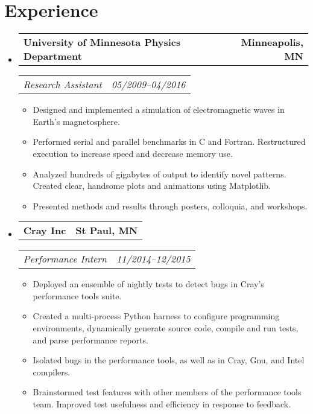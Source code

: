 \documentclass[11pt,letterpaper]{article}
\makeatletter
\newcommand{\headerrow}[2]{
  \begin{tabular*}{\linewidth}{l@{ \extracolsep{\fill} }r} #1 & #2 
  \end{tabular*}}
\newcommand{\YearRange}[2]{#1--#2}
\newcommand{\ResumeSection}[1]{
  \section*{ {\color{MidnightBlue}#1 \sout{\hfill} } } }
\newcommand{\CPP}{
  C\nolinebreak[4]\hspace{-.05em}\raisebox{.22ex}{\footnotesize\bf ++}\xspace}
\makeatother
\begin{document}

\ResumeSection{Experience}

\begin{itemize}[leftmargin=\parindent]
  \parskip=0.1em
  \itemsep=1.5em

  \item[]
    \headerrow{ \textbf{University of Minnesota Physics Department} }
              { \textbf{Minneapolis, MN} }
    \headerrow{ \emph{Research Assistant} }
              { \emph{ \YearRange{05/2009}{04/2016} } }
    \begin{itemize}
      \item Designed and implemented a simulation of electromagnetic waves in
            Earth's magnetosphere. 
      \item Performed serial and parallel benchmarks in \CPP and Fortran.
            Restructured execution to increase speed and decrease memory use. 
      \item Analyzed hundreds of gigabytes of output to identify novel 
            patterns. Created clear, handsome plots and animations using
            Matplotlib. 
      \item Presented methods and results through posters, colloquia, and
            workshops. 
    \end{itemize}

  \item[]
    \headerrow{ \textbf{Cray Inc} }{ \textbf{St Paul, MN} }
    \headerrow{ \emph{Performance Intern} }
              { \emph{ \YearRange{11/2014}{12/2015} } }
    \begin{itemize}
      \item Deployed an ensemble of nightly tests to detect bugs in Cray's 
            performance tools suite. 
      \item Created a multi-process Python harness to configure programming
            environments, dynamically generate source code, compile and run
            tests, and parse performance reports. 
      \item Isolated bugs in the performance tools, as well as in Cray, Gnu,
            and Intel compilers. 
      \item Brainstormed test features with other members of the performance
            tools team. Improved test usefulness and efficiency in response to
            feedback. 
    \end{itemize}


\end{itemize}
\end{document}
